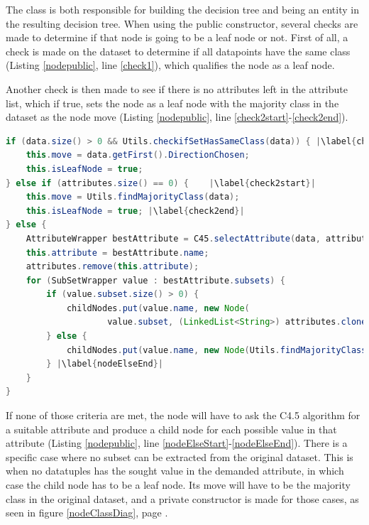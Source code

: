 \documentclass{article}
\begin{document}
    The  class is both responsible for building the decision tree and being an entity in the resulting decision tree. When using the public constructor, several checks are made to determine if that node is going to be a leaf node or not. First of all, a check is made on the dataset to determine if all datapoints have the same class (Listing \ref{nodepublic}, line \ref{check1}), which qualifies the node as a leaf node.

    Another check is then made to see if there is no attributes left in the attribute list, which if true, sets the node as a leaf node with the majority class in the dataset as the node move (Listing \ref{nodepublic}, line \ref{check2start}-\ref{check2end}).

    \begin{lstlisting}[language=Java, caption=Excerpt from \protect\UseVerb{node} public constructor, label={nodepublic}, escapechar=|]
if (data.size() > 0 && Utils.checkifSetHasSameClass(data)) { |\label{check1}|
    this.move = data.getFirst().DirectionChosen;
    this.isLeafNode = true;
} else if (attributes.size() == 0) {    |\label{check2start}|
    this.move = Utils.findMajorityClass(data);
    this.isLeafNode = true; |\label{check2end}|
} else {
    AttributeWrapper bestAttribute = C45.selectAttribute(data, attributes);|\label{nodeElseStart}|
    this.attribute = bestAttribute.name;
    attributes.remove(this.attribute);
    for (SubSetWrapper value : bestAttribute.subsets) {
        if (value.subset.size() > 0) {
            childNodes.put(value.name, new Node(
                    value.subset, (LinkedList<String>) attributes.clone()));
        } else {
            childNodes.put(value.name, new Node(Utils.findMajorityClass(value.subset)));
        } |\label{nodeElseEnd}|
    }
}
\end{lstlisting}

    If none of those criteria are met, the node will have to ask the C4.5 algorithm for a suitable attribute and produce a child node for each possible value in that attribute (Listing \ref{nodepublic}, line \ref{nodeElseStart}-\ref{nodeElseEnd}). There is a specific case where no subset can be extracted from the original dataset. This is when no datatuples has the sought value in the demanded attribute, in which case the child node has to be a leaf node. Its move will have to be the majority class in the original dataset, and a private constructor is made for those cases, as seen in figure \ref{nodeClassDiag}, page \pageref{nodeClassDiag}.
\end{document}
